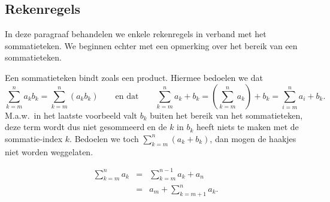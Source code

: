 \documentclass{ximera}
\begin{document}
\subsection{Rekenregels}\label{M02_rekenregels} 
\setcounter{rr}{1} In deze paragraaf behandelen we enkele
rekenregels in verband met het sommatieteken. We beginnen echter met
een opmerking over het bereik van een sommatieteken.
\begin{remark} Een sommatieteken
bindt zoals een product. Hiermee bedoelen we dat\[\sum_{k=m}^n a_k
b_k=\sum_{k=m}^n \left(a_k b_k\right)\qquad\textrm{en
dat}\qquad\sum_{k=m}^n a_k+b_k=\left(\sum_{k=m}^n
a_k\right)+b_k=\sum_{i=m}^n a_i+b_k.\] M.a.w.~in het laatste
voorbeeld valt $b_k$ buiten het bereik van het sommatieteken, deze
term wordt dus niet gesommeerd en de $k$ in $b_k$ heeft niets te
maken met de sommatie-index $k$. Bedoelen we toch $\sum_{k=m}^n
\left(a_k+b_k\right)$, dan mogen de haakjes niet worden weggelaten.
\end{remark} \begin{rekenregel} \begin{eqnarray*}
\sum_{k=m}^na_k&=&\sum_{k=m}^{n-1}a_k+a_n\\
&=&a_m+\sum_{k=m+1}^na_k. \end{eqnarray*} \end{rekenregel}
\end{document}
